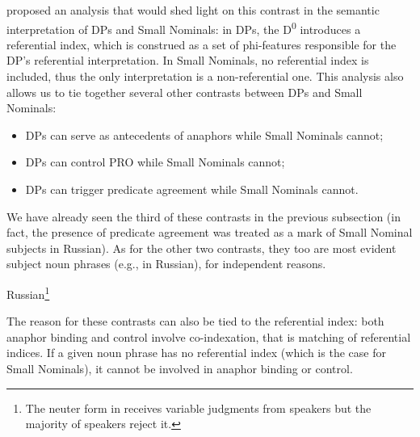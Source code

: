 \documentclass[output=paper]{langsci/langscibook}
\begin{document}
\citet{Pereltsvaig2001} proposed an analysis that would shed light on this contrast in the semantic interpretation of DPs and Small Nominals: 
in DPs, the D\textsuperscript{0} introduces a referential index, which is construed as a set of phi-features responsible for the DP’s referential interpretation. 
In Small Nominals, no referential index is included, thus the only interpretation is a non-referential one. 
This analysis also allows us to tie together several other contrasts between DPs and Small Nominals:

\begin{itemize}
\item DPs can serve as antecedents of anaphors while Small Nominals cannot;
\item DPs can control PRO while Small Nominals cannot;
\item DPs can trigger predicate agreement while Small Nominals cannot.
\end{itemize}

We have already seen the third of these contrasts in the previous subsection 
(in fact, the presence of predicate agreement was treated as a mark of Small Nominal subjects in Russian). 
As for the other two contrasts, they too are most evident subject noun phrases (e.g., in Russian), for independent reasons.

\ea%
    \label{pereex:key:13}
    Russian\footnote{The neuter form in  receives variable judgments from speakers but the majority of speakers reject it.} 
    \z 
\z 

The reason for these contrasts can also be tied to the referential index: 
both anaphor binding and control involve co-indexation, that is matching of referential indices. 
If a given noun phrase has no referential index (which is the case for Small Nominals), it cannot be involved in anaphor binding or control.
\end{document}
